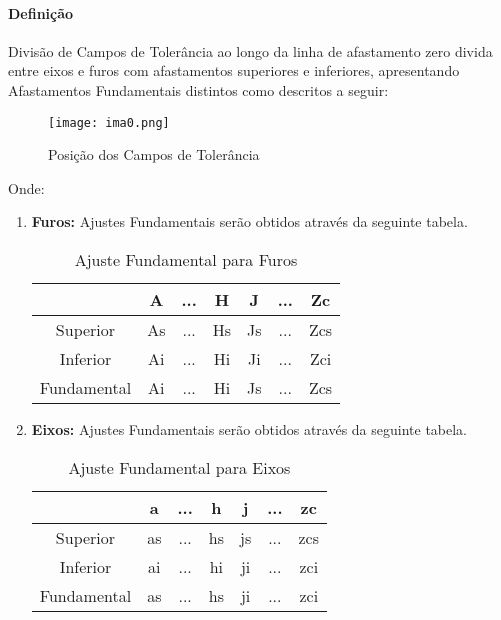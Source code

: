 \documentclass{article}
\begin{document}
            \paragraph{Definição}Divisão de Campos de Tolerância ao longo da linha de afastamento zero divida entre eixos e furos com afastamentos superiores e inferiores, apresentando Afastamentos Fundamentais distintos como descritos a seguir:
                \begin{figure}[H]
                    \centering
                    \texttt{[image: ima0.png]}
                    \caption{Posição dos Campos de Tolerância}\label{fig:fields}
                \end{figure} \noindent
            Onde:
                \begin{enumerate}[noitemsep]
                    \item \textbf{Furos:} Ajustes Fundamentais serão obtidos através da seguinte tabela.
                        \begin{table}[H]
                            \centering
                            \begin{tabular}[]{c c c c | c c c}\hline
                                            & A  & ... & H  & J  & ... & Zc\\\hline
                                Superior    & As & ... & Hs & Js & ... & Zcs\\
                                Inferior    & Ai & ... & Hi & Ji & ... & Zci\\\hline
                                Fundamental & Ai & ... & Hi & Js & ... & Zcs\\\hline
                            \end{tabular}
                            \caption{Ajuste Fundamental para Furos}\label{table:holes}
                        \end{table}
                    \item \textbf{Eixos:} Ajustes Fundamentais serão obtidos através da seguinte tabela.
                        \begin{table}[H]
                            \centering
                            \begin{tabular}[]{c c c c | c c c}\hline
                                            & a  & ... & h  & j  & ... & zc\\\hline
                                Superior    & as & ... & hs & js & ... & zcs\\
                                Inferior    & ai & ... & hi & ji & ... & zci\\\hline
                                Fundamental & as & ... & hs & ji & ... & zci\\\hline
                            \end{tabular}
                            \caption{Ajuste Fundamental para Eixos}\label{table:axis}
                        \end{table}
                \end{enumerate}
\end{document}
